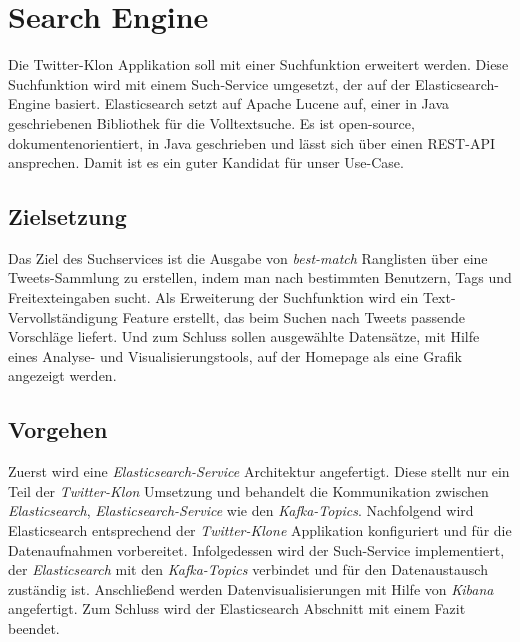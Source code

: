 \chapter{Search Engine}
Die Twitter-Klon Applikation soll mit einer Suchfunktion erweitert werden. Diese Suchfunktion wird mit einem Such-Service umgesetzt, der auf der Elasticsearch-Engine basiert. Elasticsearch setzt auf Apache Lucene auf, einer in Java geschriebenen Bibliothek für die Volltextsuche. Es ist open-source, dokumentenorientiert, in Java geschrieben und lässt sich über einen REST-API ansprechen. Damit ist es ein guter Kandidat für unser Use-Case.

\section{Zielsetzung}
Das Ziel des Suchservices ist die Ausgabe von \textit{best-match} Ranglisten über eine Tweets-Sammlung zu erstellen, indem man nach bestimmten Benutzern, Tags und Freitexteingaben sucht. Als Erweiterung der Suchfunktion wird ein Text-Vervollständigung Feature erstellt, das beim Suchen nach Tweets passende Vorschläge liefert. Und zum Schluss sollen ausgewählte Datensätze, mit Hilfe eines Analyse- und Visualisierungstools, auf der Homepage als eine Grafik angezeigt werden. 

\section{Vorgehen}
Zuerst wird eine \textit{Elasticsearch-Service} Architektur angefertigt. Diese stellt nur ein Teil der \textit{Twitter-Klon} Umsetzung und behandelt die Kommunikation zwischen \textit{Elasticsearch}, \textit{Elasticsearch-Service} wie den \textit{Kafka-Topics}. Nachfolgend wird Elasticsearch entsprechend der \textit{Twitter-Klone} Applikation konfiguriert und für die Datenaufnahmen vorbereitet. Infolgedessen wird der Such-Service implementiert, der \textit{Elasticsearch} mit den \textit{Kafka-Topics} verbindet und für den Datenaustausch zuständig ist. Anschließend werden Datenvisualisierungen mit Hilfe von \textit{Kibana} angefertigt. Zum Schluss wird der Elasticsearch Abschnitt mit einem Fazit beendet.

